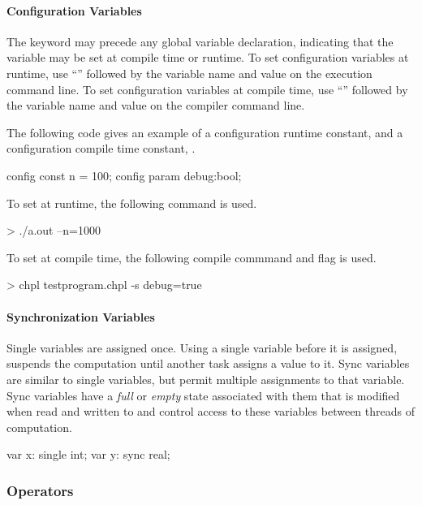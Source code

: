 \paragraph{Configuration Variables}
The keyword  may precede any global variable
declaration, indicating that the variable may be set at
compile time or runtime.
To set configuration variables at runtime, use ``\chpl{--}''
followed by the variable name and value on the execution
command line.
To set configuration variables at compile time, use
``'' followed by the variable name and value on the
compiler command line.

\begin{example}
The following code gives an example of a configuration
runtime constant,  and a configuration compile time constant,
.
\begin{chapel}
config const n = 100;
config param debug:bool;
\end{chapel}

To set  at runtime, the following command is used.
\begin{commandline}
> ./a.out --n=1000
\end{commandline}

To set  at compile time, the following compile commmand
and flag is used.
\begin{commandline}
> chpl testprogram.chpl -s debug=true
\end{commandline}
\end{example}

\paragraph{Synchronization Variables}
Single variables are assigned once.  Using a single variable
before it is assigned, suspends the computation until another
task assigns a value to it.
Sync variables are similar to single variables,
but permit multiple assignments to that variable. Sync
variables have a {\em full} or {\em empty} state associated
with them that is modified when read and written to and control
access to these variables between threads of computation.
\begin{chapel}
var x: single int;
var y: sync real;
\end{chapel}

\subsubsection{Operators}
